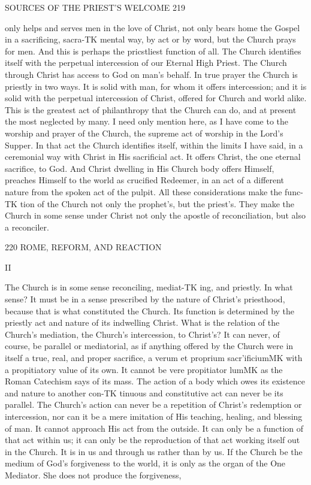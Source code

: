 \documentclass[12pt,a5paper,oneside]{book}
\begin{document}
{{SOURCES OF THE PRIEST'S WELCOME 219 

only helps and serves men in the love of Christ, not 
only bears home the Gospel in a sacrificing, sacra-TK
mental way, by act or by word, but the Church 
prays for men. And this is perhaps the pricstliest 
function of all. The Church identifies itself with 
the perpetual intercession of our Eternal High Priest. 
The Church through Christ has access to God on 
man's behalf. In true prayer the Church is priestly 
in two ways. It is solid with man, for whom it 
offers intercession; and it is solid with the perpetual 
intercession of Christ, offered for Church and world 
alike. This is the greatest act of philanthropy that 
the Church can do, and at present the most neglected 
by many. I need only mention here, as I have come 
to the worship and prayer of the Church, the supreme 
act of worship in the Lord's Supper. In that act the 
Church identifies itself, within the limits I have said, 
in a ceremonial way with Christ in His sacrificial act. 
It offers Christ, the one eternal sacrifice, to God. And 
Christ dwelling in His Church body offers Himself, 
preaches Himself to the world as crucified Redeemer, 
in an act of a different nature from the spoken act of 
the pulpit. All these considerations make the func-TK
tion of the Church not only the prophet's, but the 
priest's. They make the Church in some sense under 
Christ not only the apostle of reconciliation, but also 
a reconciler. 



220 ROME, REFORM, AND REACTION 

II 

The Church is in some sense reconciling, mediat-TK
ing, and priestly. In what sense? It must be in a 
sense prescribed by the nature of Christ's priesthood, 
because that is what constituted the Church. Its 
function is determined by the priestly act and nature 
of its indwelling Christ. What is the relation of the 
Church's mediation, the Church's intercession, to 
Christ's? It can never, of course, be parallel or 
mediatorial, as if anything offered by the Church were 
in itself a true, real, and proper sacrifice, a verum et 
proprium sacr'ificiumMK with a propitiatory value of its 
own. It cannot be vere propitiator lumMK as the Roman 
Catechism says of its mass. The action of a body 
which owes its existence and nature to another con-TK
tinuous and constitutive act can never be its parallel. 
The Church's action can never be a repetition of 
Christ's redemption or intercession, nor can it be a 
mere imitation of His teaching, healing, and blessing 
of man. It cannot approach His act from the outside. 
It can only be a function of that act within us; it can 
only be the reproduction of that act working itself out 
in the Church. It is in us and through us rather 
than by us. If the Church be the medium of God's 
forgiveness to the world, it is only as the organ of the 
One Mediator. She does not produce the forgiveness, 



}}
\end{document}
